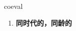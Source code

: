 
\begin{frame}
{\huge coeval}
\begin{center}
\begin{enumerate}\Large
  \item \textbf{同时代的，同龄的}
\end{enumerate}
\end{center}
\end{frame}
